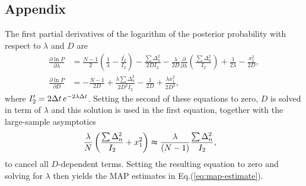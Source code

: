 \documentclass[english,aps, onecolumn, prl,superscriptaddress, notitlepage]{revtex4-1}
\begin{document}
\subsection{Appendix}

The first partial derivatives of the logarithm of the posterior probability
with respect to $\lambda$ and $D$ are
\begin{align*}
\frac{\partial\ln P}{\partial\lambda} & =\frac{N-1}{2}\left(\frac{1}{\lambda}-\frac{I_{2}^{\prime}}{I_{2}}\right)-\frac{\sum\Delta_{n}^{2}}{2DI_{2}}
  -\frac{\lambda}{2D}\frac{\partial}{\partial\lambda}\left(\frac{\sum\Delta_{n}^{2}}{I_{2}}\right)+\frac{1}{2\lambda}-\frac{x_{1}^{2}}{2D},
\\
\frac{\partial\ln P}{\partial D} & =-\frac{N-1}{2D}+\frac{\lambda\sum\Delta_{n}^{2}}{2D^{2}I_{2}}-\frac{1}{2D}+\frac{\lambda x_{1}^{2}}{2D^{2}},
\end{align*}
where $I_{2}^{\prime}=2\Delta t\thinspace e^{-2\lambda\Delta t}$.
Setting the second of these equations to zero, $D$ is solved in term
of $\lambda$ and this solution is used in the first equation, together
with the large-sample asymptotics
\begin{align*}
\frac{\lambda}{N}\left(\frac{\sum\Delta_{n}^{2}}{I_{2}}+x_{1}^{2}\right) & \thickapprox\frac{\lambda}{\left(N-1\right)}\frac{\sum\Delta_{n}^{2}}{I_{2}},
\end{align*}
to cancel all $D$-dependent terms. Setting the resulting equation
to zero and solving for $\lambda$ then yields the MAP estimates in
Eq.(\ref{eq:map-estimate}). 
\end{document}
